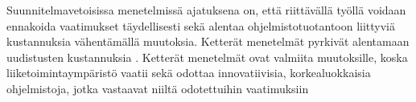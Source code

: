 \documentclass[finnish]{tktltiki2}
\theoremstyle{definition}
\theoremstyle{remark}
\begin{document}
Suunnitelmavetoisissa menetelmissä ajatuksena on, että riittävällä työllä voidaan ennakoida vaatimukset täydellisesti sekä alentaa ohjelmistotuotantoon liittyviä kustannuksia vähentämällä muutoksia. Ketterät menetelmät pyrkivät alentamaan uudistusten kustannuksia \cite{WIC03}. Ketterät menetelmät ovat valmiita muutoksille, koska liiketoimintaympäristö vaatii sekä odottaa innovatiivisia, korkealuokkaisia ohjelmistoja, jotka vastaavat niiltä odotettuihin vaatimuksiin \cite{BRL03}


%
%
% 
%



\end{document}
